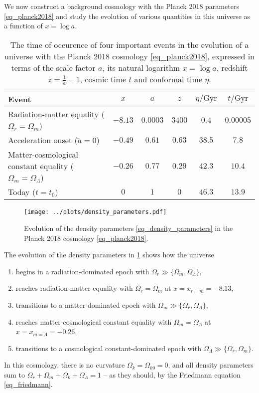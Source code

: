 \documentclass{aa}
\begin{document}
We now construct a background cosmology with the Planck 2018 parameters \eqref{eq_planck2018}
and study the evolution of various quantities in this universe as a function of $x = \log a$.

\begin{table*}
\centering
\caption{The time of occurence of four important events in the evolution of a universe with the Planck 2018 cosmology \eqref{eq_planck2018}, expressed in terms of the scale factor $a$, its natural logarithm $x = \log a$, redshift $z = \frac1a - 1$, cosmic time $t$ and conformal time $\eta$.}
\begin{tabular}{l c c c c c}
	\toprule
	Event                                                               & $x$     & $a$       & $z$    & $\eta / \mathrm{Gyr}$    & $t / \mathrm{Gyr}$ \\
	\midrule
	Radiation-matter equality ($\Omega_r = \Omega_m$)                   & $-8.13$ & $0.0003$  & $3400$ & $0.4$ & $0.00005$ \\
	Acceleration onset ($\ddot{a} = 0$)                                 & $-0.49$ & $0.61$    & $0.63$ & $38.5$ & $7.8$   \\
	Matter-cosmological constant equality ($\Omega_m = \Omega_\Lambda$) & $-0.26$ & $0.77$    & $0.29$ & $42.3$ & $10.4$  \\
	Today ($t = t_0$)                                                   & $0$     & $1$       & $0$    & $46.3$ & $13.9$  \\
	\bottomrule
\end{tabular}
\end{table*}

\begin{figure}
	\centering
	\texttt{[image: ../plots/density\_parameters.pdf]}
\caption{Evolution of the density parameters \eqref{eq_density_parameters} in the Planck 2018 cosmology \eqref{eq_planck2018}.}
\label{fig_density_parameters}
\end{figure}

The evolution of the density parameters in \cref{fig_density_parameters} shows how the universe
\begin{enumerate}
	\item begins in a radiation-dominated epoch with $\Omega_r \gg \{\Omega_m, \Omega_\Lambda\}$,
	\item reaches radiation-matter equality with $\Omega_r = \Omega_m$ at $x = x_{r=m} = -8.13$,
	\item transitions to a matter-dominated epoch with $\Omega_m \gg \{\Omega_r, \Omega_\Lambda\}$,
	\item reaches matter-cosmological constant equality with $\Omega_m = \Omega_\Lambda$ at $x = x_{m=\Lambda} = -0.26$,
	\item transitions to a cosmological constant-dominated epoch with $\Omega_\Lambda \gg \{\Omega_r,\Omega_m\}$.
\end{enumerate}
In this cosmology, there is no curvature $\Omega_{k} = \Omega_{k0} = 0$,
and all density parameters sum to $\Omega_{r} + \Omega_m + \Omega_k + \Omega_\Lambda = 1$ -- as they should, by the Friedmann equation \eqref{eq_friedmann}.
\end{document}

